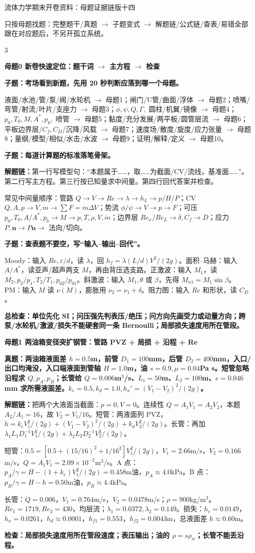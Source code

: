 \documentclass[a4paper]{article}
\newcommand{\mt}[1]{\vspace{0.22pt}\colorbox{M}{\parbox{\dimexpr\linewidth-2\fboxsep}{\color{white}\bfseries #1}}\par}
\newcommand{\qt}[1]{\vspace{0.10pt}\colorbox{Q}{\parbox{\dimexpr\linewidth-2\fboxsep}{\color{white}\bfseries #1}}\par}
\newcommand{\ans}[1]{\colorbox{G}{\parbox{\dimexpr\linewidth-2\fboxsep}{#1}}\par}
\newcommand{\warn}[1]{\colorbox{Y}{\parbox{\dimexpr\linewidth-2\fboxsep}{\color{E}\bfseries #1}}\par}
\newcommand{\chain}[1]{{\color{A}\bfseries 解题链：}#1\par}
\begin{document}
\fontsize{3.08}{3.22}\selectfont
\begin{center}
{\heiti\fontsize{6.1}{6.35}\selectfont 流体力学期末开卷资料：母题证据链版十四}\par
{\fontsize{3.20}{3.38}\selectfont 只按母题找题：完整题干/真题 $\to$ 子题变式 $\to$ 解题链/公式链/查表/易错全部跟在对应题后，不另开孤立系统。}
\end{center}
\vspace{-3.4pt}
\begin{multicols}{3}

\mt{母题0 新卷快速定位：题干词 $\to$ 主方程 $\to$ 检查}
\qt{子题：考场看到新题，先用 20 秒判断应落到哪一个母题。}
\ans{液面/水池/管/泵/阀/水轮机 $\to$ 母题1；闸门/U管/曲面/浮体 $\to$ 母题2；喷嘴/弯管/射流/叶片/支座力 $\to$ 母题3；$\phi,\psi,Q,\Gamma,$ 圆柱/机翼/镜像 $\to$ 母题4；$p_0,T_0,M,A^*,p_b,$ 喷管 $\to$ 母题5；黏度/充分发展/两平板/圆管层流 $\to$ 母题6；平板边界层/$C_f,C_D$/沉降/风载 $\to$ 母题7；速度场/散度/旋度/应力张量 $\to$ 母题8；量纲/模型/相似/水击/水波 $\to$ 母题9；证明/解释/定义 $\to$ 母题10。}
\qt{子题：每道计算题的标准落笔骨架。}
\chain{第一行写模型句：“本题属于……，取……为截面/CV/流线，基准面……”。第二行写主方程。第三行按已知量求中间量。第四行回代答案并检查。}
\ans{常见中间量顺序：管路 $Q\to V\to Re\to\lambda\to h_L\to p/H/P$；CV $Q,A,p\to V,\dot m\to \sum F=\dot m\Delta V$；势流 $\phi/\psi\to V\to p\to F$；可压 $p_0,T_0,A/A^*,p_b\to M\to p,T,\rho,V,\dot m$；边界层 $Re_x/Re_L\to\delta,C_f\to D$；应力 $P,\bm n\to P\bm n\to$ 法向/切向。}
\qt{子题：查表题不要空，写“输入--输出--回代”。}
\ans{Moody：输入 $Re,\varepsilon/d$，读 $\lambda$，回 $h_f=\lambda(L/d)V^2/(2g)$。面积--马赫：输入 $A/A^*$，读亚声/超声两支 $M$，再由背压选支路。正激波：输入 $M_1$，读 $M_2,p_2/p_1,T_2/T_1,p_{02}/p_{01}$。斜激波：输入 $M_1,\theta$ 或 $\beta$，先得 $M_{n1}=M_1\sin\beta$。PM：输入 $M$ 读 $\nu(M)$，膨胀用 $\nu_2=\nu_1+\delta$。阻力图：输入 $Re$ 和形状，读 $C_D$。}
\warn{总检查：单位先化 SI；问压强先判表压/绝压；问方向先画受力或动量方向；跨泵/水轮机/激波/损失不能硬套同一条 Bernoulli；局部损失速度用所在管段。}


\mt{母题1 两油箱变径突扩钢管：管路 PVZ + 局损 + 沿程 + Re}
\qt{真题：两油箱液面差 $h=0.5$m，前管 $D_1=100$mm，后管 $D_2=400$mm，入口/出口均淹没，入口端液面到管轴 $H=1.0$m，油 $s=0.9,\mu=0.04$Pa s。短管忽略沿程求 $Q,p_A,p_B$；长管给 $Q=0.006$m$^3$/s、$L_1=50$m、$L_2=100$m、$e=0.046$mm 求所需液面差。$k_e=0.5,k_d=1.0,h_x'=(V_1-V_2)^2/(2g)$。}
\chain{把两个大液面当截面：$p=0,V=0$。连续性 $Q=A_1V_1=A_2V_2$，本题 $A_2/A_1=16$，故 $V_2=V_1/16$。短管：两液面列 PVZ，$h=k_eV_1^2/(2g)+(V_1-V_2)^2/(2g)+k_dV_2^2/(2g)$。长管：再加 $\lambda_1L_1D_1^{-1}V_1^2/(2g)+\lambda_2L_2D_2^{-1}V_2^2/(2g)$。}
\ans{短管：$0.5=[0.5+(15/16)^2+1/16^2]V_1^2/(2g)$，$V_1=2.66$m/s，$V_2=0.166$m/s，$Q=A_1V_1=2.09\times10^{-2}$m$^3$/s。A 点：$p_A/\gamma=H-(1+k_e)V_1^2/(2g)=0.458$m油，$p_A\approx4.0$kPa。B 点：$p_B/\gamma=H-h=0.50$m油，$p_B\approx4.4$kPa。}
\ans{长管：$Q=0.006$，$V_1=0.764$m/s，$V_2=0.0478$m/s；$\rho=900$kg/m$^3$。$Re_1=1719,Re_2=430$，均层流；$\lambda_1=0.0372,\lambda_2=0.149$。损失：$h_e=0.0149$，$h_x=0.0261$，$h_d\approx0.0001$，$h_{f1}=0.553$，$h_{f2}=0.0043$m，总液面差 $h\approx0.60$m。}
\warn{检查：局部损失速度用所在管段速度；表压输出；油的 $\rho=s\rho_w$；长管不能丢沿程。}


\end{multicols}
\end{document}
